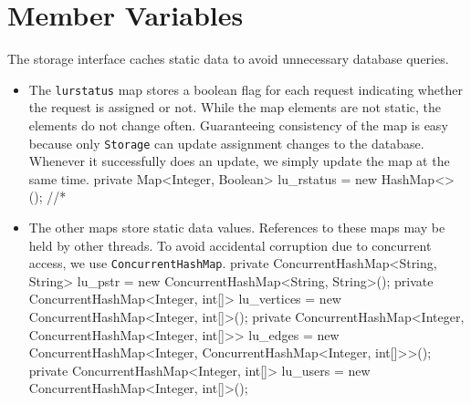 \section{Member Variables}
The storage interface caches static data to avoid unnecessary database queries.
\begin{itemize}
\item The {\tt{}lu{}rstatus} map stores a boolean flag for each request indicating
whether the request is assigned or not. While the map elements are not static,
the elements do not change often. Guaranteeing consistency of the map is easy
because only {\tt{}Storage} can update assignment changes to the database.
Whenever it successfully does an update, we simply update the map at the same
time.
\nwenddocs{}\endmoddef{}
private Map<Integer, Boolean> lu_rstatus = new HashMap<>();  //*
\nwendcode{}\nwdocspar
\item The other maps store static data values. References to these maps may be
held by other threads. To avoid accidental corruption due to concurrent access,
we use {\tt{}ConcurrentHashMap}.
\nwenddocs{}\plusendmoddef
private ConcurrentHashMap<String, String> lu_pstr     = new ConcurrentHashMap<String, String>();
private ConcurrentHashMap<Integer, int[]> lu_vertices = new ConcurrentHashMap<Integer, int[]>();
private ConcurrentHashMap<Integer,
    ConcurrentHashMap<Integer, int[]>>    lu_edges    = new ConcurrentHashMap<Integer, ConcurrentHashMap<Integer, int[]>>();
private ConcurrentHashMap<Integer, int[]> lu_users    = new ConcurrentHashMap<Integer, int[]>();
\nwendcode{}\nwdocspar
\end{itemize}

